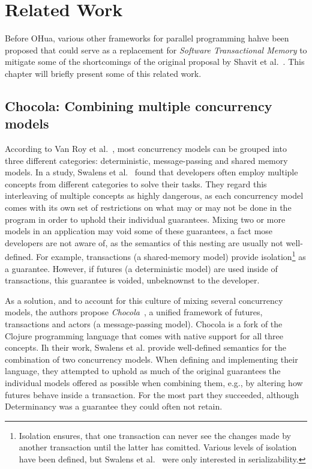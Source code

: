 %
\chapter{Related Work}
\label{sec:related}

Before OHua, various other frameworks for parallel programming hahve been proposed that could serve as a replacement for \emph{Software Transactional Memory} to mitigate some of the shortcomings of the original proposal by Shavit et al.~\cite{shavit1997software}.
This chapter will briefly present some of this related work.

\section{Chocola: Combining multiple concurrency models}
According to Van Roy et al.~\cite{van2004concepts}, most concurrency models can be grouped into three different categories: deterministic, message-passing and shared memory models.
In a study, Swalens et al.~\cite{swalens2018chocola} found that developers often employ multiple concepts from different categories to solve their tasks.
They regard this interleaving of multiple concepts as highly dangerous, as each concurrency model comes with its own set of restrictions on what may or may not be done in the program in order to uphold their individual guarantees.
Mixing two or more models in an application may void some of these guarantees, a fact mose developers are not aware of, as the semantics of this nesting are usually not well-defined.
For example, transactions (a shared-memory model) provide isolation\footnote{Isolation ensures, that one transaction can never see the changes made by another transaction until the latter has comitted. Various levels of isolation have been defined, but Swalens et al.~\cite{swalens2018chocola} were only interested in serializability.} as a guarantee.
However, if futures (a deterministic model) are used inside of transactions, this guarantee is voided, unbeknownst to the developer.

As a solution, and to account for this culture of mixing several concurrency models, the authors propose \emph{Chocola}~\cite{swalens2018chocola}, a unified framework of futures, transactions and actors (a message-passing model).
Chocola is a fork of the Clojure programming language that comes with native support for all three concepts.
Ih their work, Swalens et al. provide well-defined semantics for the combination of two concurrency models.
When defining and implementing their language, they attempted to uphold as much of the original guarantees the individual models offered as possible when combining them, e.g., by altering how futures behave inside a transaction.
For the most part they succeeded, although Determinancy was a guarantee they could often not retain.

